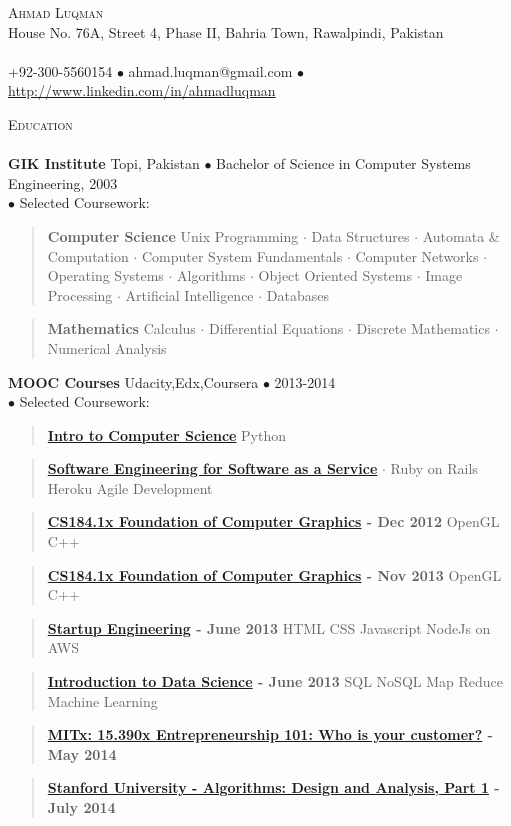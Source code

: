 \documentclass{article}
\newcommand{\area}[2]{\vspace*{-9pt} \begin{verse}\textbf{#1}   #2 \end{verse}  }
\newcommand{\lineunder}{\vspace*{-8pt} \\ \hspace*{-18pt} \hrulefill \\}
\newcommand{\header}[1]{{\hspace*{-15pt}\vspace*{6pt} \textsc{#1}} \vspace*{-6pt} \lineunder}
\newcommand{\contact}[3]{
\vspace*{-8pt}
\begin{center}
{\LARGE \scshape {#1}}\\
#2 \lineunder 
#3
\end{center}
\vspace*{-8pt}
}
\newcommand{\schoolwithcourses}[4]{
 \textbf{#1} #2 $\bullet$ #3\\ 
#4 $\bullet$  Selected Coursework:\\
\vspace*{5pt}
}
\begin{document}
\small
\smallskip
\vspace*{-44pt}

\contact{Ahmad Luqman}
{House No. 76A, Street 4, Phase II, Bahria Town, Rawalpindi, Pakistan}
{+92-300-5560154 $\bullet$ ahmad.luqman@gmail.com  $\bullet$\url{http://www.linkedin.com/in/ahmadluqman}}

\header{Education}

\schoolwithcourses{GIK Institute}{Topi, Pakistan}{Bachelor of Science in Computer Systems Engineering, 2003}
{}
	\area{Computer Science}{ Unix Programming $\cdot$ Data Structures $\cdot$ Automata \& Computation $\cdot$ Computer System Fundamentals $\cdot$ Computer Networks $\cdot$ Operating Systems $\cdot$
 Algorithms $\cdot$ Object Oriented Systems $\cdot$ Image Processing $\cdot$
Artificial Intelligence $\cdot$ Databases}
	\area{Mathematics}{Calculus $\cdot$ Differential Equations $\cdot$ Discrete Mathematics $\cdot$ Numerical Analysis}
\schoolwithcourses{MOOC Courses}{Udacity,Edx,Coursera}{2013-2014}
{}
	\area{\href{http://www.udacity.com/overview/Course/cs101}{Intro to Computer Science}}{Python}
	\area{\href{https://www.class-central.com/mooc/305/coursera-software-as-a-service}{Software Engineering for Software as a Service}}{ $\cdot$ Ruby on Rails Heroku Agile Development}
	\area{\href{https://www.edx.org/course/uc-berkeleyx/uc-berkeleyx-cs-184-1x-foundations-1003}{CS184.1x Foundation of Computer Graphics} - Dec 2012}{ OpenGL C++}
	\area{\href{https://www.edx.org/course/uc-berkeleyx/uc-berkeleyx-cs-184-1x-foundations-1003}{CS184.1x Foundation of Computer Graphics} - Nov 2013}{ OpenGL C++}
	\area{\href{https://www.coursera.org/course/startup}{Startup Engineering} - June 2013}{ HTML CSS Javascript NodeJs on AWS}
	\area{\href{https://www.coursera.org/course/datasci}{Introduction to Data Science} - June 2013}{SQL NoSQL Map Reduce Machine Learning}
	\area{\href{https://class.coursera.org/hetero-002}{MITx: 15.390x Entrepreneurship 101: Who is your customer?} - May 2014}{}
	\area{\href{https://class.coursera.org/algo-005}{Stanford University - Algorithms: Design and Analysis, Part 1} - July 2014}{}
\end{document}
